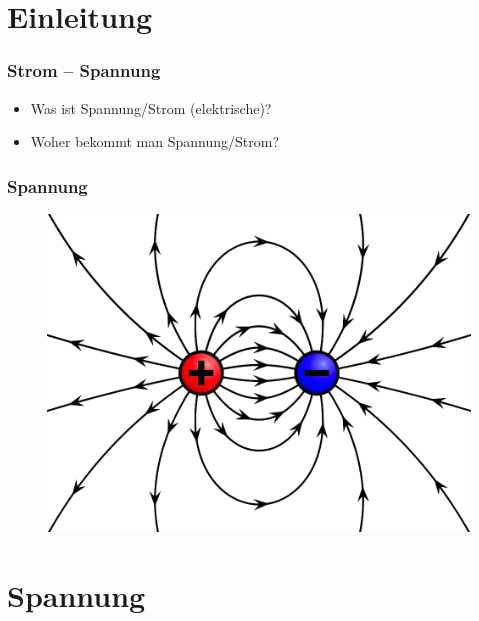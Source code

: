

\subtitle{Technik 02: \\
          Spannung und Strom, Wechselspannung \\[2em]}
\date{Stand 18.09.2017}


\section*{Einleitung}

\begin{frame}
  \frametitle{Strom -- Spannung}
  \begin{itemize}
    \item Was ist Spannung/Strom (elektrische)?
    \item Woher bekommt man Spannung/Strom?
  \end{itemize}
\end{frame}

\begin{frame}
  \frametitle{Spannung}
  \begin{center}
    \begin{figure}
      \includegraphics[width=.6\textwidth,height=.75\textheight,keepaspectratio]{e02/ladung.png}
    \end{figure}
  \end{center}
\end{frame}


\section*{Spannung}

